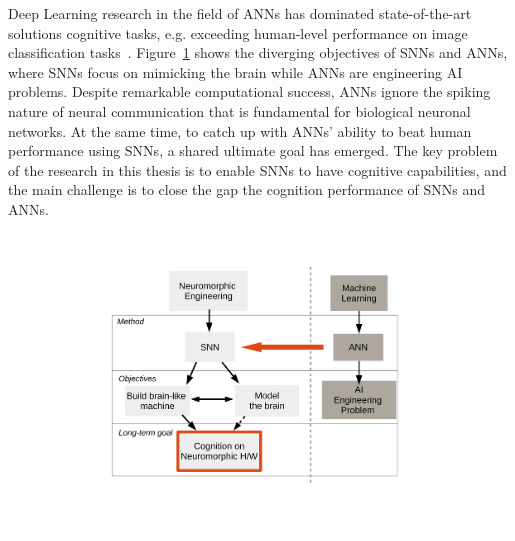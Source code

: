 Deep Learning research in the field of ANNs has dominated \protect{} state-of-the-art solutions \protect{} \protect{} cognitive tasks, e.g. \protect{} exceeding human-level performance on image classification tasks~\citep{he2015delving}.
Figure~\ref{fig:intro} shows the diverging objectives of SNNs and ANNs, where SNNs focus on mimicking the brain while ANNs are \protect{} \protect{} engineering AI problems.
Despite remarkable computational success, ANNs ignore the spiking nature of neural communication that is fundamental for biological neuronal networks.
At the same time, to catch up with ANNs' ability to beat human performance using SNNs, a shared ultimate goal has emerged.
The key problem of the research \protect{} \protect{} in this thesis is to enable SNNs to have cognitive capabilities, and the main challenge is to close the gap \protect{} \protect{} the cognition performance of SNNs and \protect{} ANNs.

\protect{}\begin{figure}[tbh!]
	\centering
	\includegraphics[width=1.0\textwidth]{pics_intro/intro2.pdf}
	\caption{\protect{}}
	\label{fig:intro}
\end{figure}




